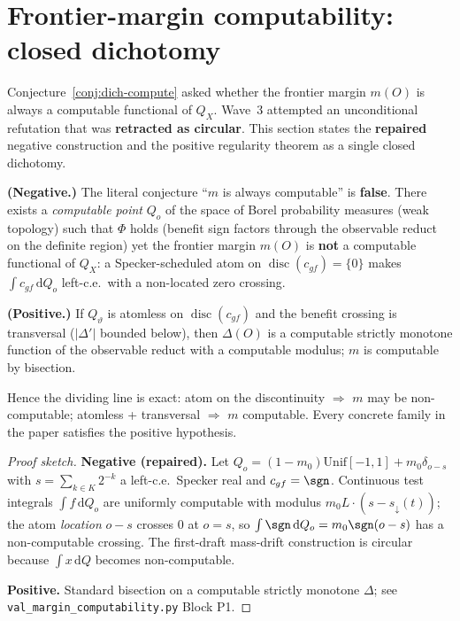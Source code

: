 \section{Frontier-margin computability: closed dichotomy}\label{sec:margin-compute-closure}

Conjecture~\ref{conj:dich-compute} asked whether the frontier margin $m(O)$ is always a
computable functional of $Q_X$. Wave~3 attempted an unconditional refutation that was
\textbf{retracted as circular}. This section states the \textbf{repaired} negative construction
and the positive regularity theorem as a single closed dichotomy.

\begin{theorem}\label{thm:margin-compute-dichotomy}
\textbf{(Negative.)} The literal conjecture ``$m$ is always computable'' is \textbf{false}.
There exists a \emph{computable point} $Q_o$ of the space of Borel probability measures (weak
topology) such that $\Phi$ holds (benefit sign factors through the observable reduct on the
definite region) yet the frontier margin $m(O)$ is \textbf{not} a computable functional of
$Q_X$: a Specker-scheduled atom on $\operatorname{disc}(c_{gf})=\{0\}$ makes
$\int c_{gf}\,\mathrm dQ_o$ left-c.e.\ with a non-located zero crossing.

\textbf{(Positive.)} If $Q_\vartheta$ is atomless on $\operatorname{disc}(c_{gf})$ and the
benefit crossing is transversal ($|\Delta'|$ bounded below), then $\Delta(O)$ is a computable
strictly monotone function of the observable reduct with a computable modulus; $m$ is computable
by bisection.

Hence the dividing line is exact: atom on the discontinuity $\Rightarrow$ $m$ may be
non-computable; atomless + transversal $\Rightarrow$ $m$ computable. Every concrete family in
the paper satisfies the positive hypothesis.
\end{theorem}

\begin{proof}[Proof sketch]
\textbf{Negative (repaired).} Let $Q_o=(1-m_0)\mathrm{Unif}[-1,1]+m_0\delta_{o-s}$ with
$s=\sum_{k\in K}2^{-k}$ a left-c.e.\ Specker real and $c_{gf}=\sgn$. Continuous test integrals
$\int f\,\mathrm dQ_o$ are uniformly computable with modulus $m_0 L\cdot(s-s_{\downarrow}(t))$;
the atom \emph{location} $o-s$ crosses $0$ at $o=s$, so $\int\sgn\,\mathrm dQ_o=m_0\sgn(o-s)$
has a non-computable crossing. The first-draft mass-drift construction is circular because
$\int x\,\mathrm dQ$ becomes non-computable.

\textbf{Positive.} Standard bisection on a computable strictly monotone $\Delta$; see
\texttt{val\_margin\_computability.py} Block P1.
\end{proof}
